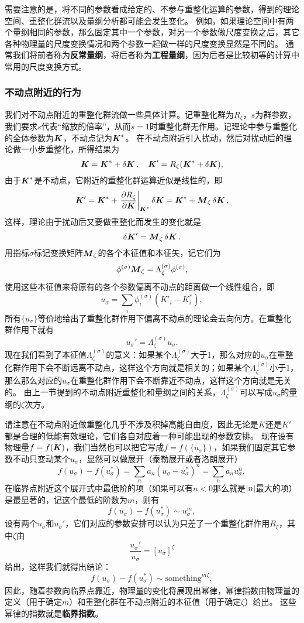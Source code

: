 \documentclass[hyperref, UTF8, a4paper]{ctexart}
\begin{document}
需要注意的是，将不同的参数看成给定的、不参与重整化运算的参数，得到的理论空间、重整化群流以及量纲分析都可能会发生变化。
例如，如果理论空间中有两个量纲相同的参数，那么固定其中一个参数，对另一个参数做尺度变换之后，其它各种物理量的尺度变换情况和两个参数一起做一样的尺度变换显然是不同的。
通常我们将前者称为\textbf{反常量纲}，将后者称为\textbf{工程量纲}，因为后者是比较初等的计算中常用的尺度变换方式。

\subsubsection{不动点附近的行为}

我们对不动点附近的重整化群流做一些具体计算。记重整化群为$R_\zeta$，$s$为群参数，我们要求$s$代表“缩放的倍率”，从而$s=1$时重整化群无作用。记理论中参与重整化的全体参数为$\vb*{K}$，不动点记为$\vb*{K}^*$。
在不动点附近引入扰动，然后对扰动后的理论做一小步重整化，所得结果为
\[
    \vb*{K} = \vb*{K}^* + \var{\vb*{K}} , \quad \vb*{K}' = R_\zeta(\vb*{K}^* + \var{\vb*{K}}),
\]
由于$\vb*{K}^*$是不动点，它附近的重整化群运算近似是线性的，即
\[
    \vb*{K}' = \vb*{K}^* + \eval{\pdv{R_\zeta}{\vb*{K}}}_{\vb*{K}^*} \var{\vb*{K}} = \vb*{K}^* + \vb*{M}_\zeta \var{\vb*{K}},
\]
这样，理论由于扰动后又要做重整化而发生的变化就是
\[
    \var{\vb*{K}'} = \vb*{M}_\zeta \var{\vb*{K}}.
\]
用指标$\sigma$标记变换矩阵$\vb*{M}_\zeta$的各个本征值和本征矢，记它们为
\[
    \phi^{(\sigma)} \vb*{M}_\zeta = \Lambda^{(\sigma)}_\zeta \phi^{(\sigma)},
\]
使用这些本征值来将原有的各个参数偏离不动点的距离做一个线性组合，即
\[
    u_\sigma = \sum_i \phi^{(\sigma)}_i (K'_i - K^*_i), 
\]
所有$\{u_\sigma\}$等价地给出了重整化群作用下偏离不动点的理论会去向何方。在重整化群作用下就有
\[
    u_\sigma' = \Lambda^{(\sigma)}_\zeta u_\sigma.
\]
现在我们看到了本征值$\Lambda_\zeta^{(\sigma)}$的意义：如果某个$\Lambda_\zeta^{(\sigma)}$大于1，那么对应的$u_\sigma$在重整化群作用下会不断远离不动点，这样这个方向就是相关的；如果某个$\Lambda_\zeta^{(\sigma)}$小于1，那么那么对应的$u_\sigma$在重整化群作用下会不断靠近不动点，这样这个方向就是无关的。
由上一节提到的不动点附近重整化和量纲之间的关系，$\Lambda_\zeta^{(\sigma)}$可以写成$u_\sigma$的量纲的$\zeta$次方。

请注意在不动点附近做重整化几乎不涉及积掉高能自由度，因此无论是$K$还是$K'$都是合理的低能有效理论，它们各自对应着一种可能出现的参数安排。
现在设有物理量$f = f(\vb*{K})$，我们当然也可以把它写成$f=f(\{u_\sigma\})$，如果我们固定其它参数不动只变动某个$u_\sigma$，显然可以做展开（泰勒展开或者洛朗展开）
\[
    f(u_\sigma) - f(u_\sigma^*) = \sum_n a_n (u_\sigma - u_\sigma^*)^n = \sum_n a_n u_\sigma^n,
\]
在临界点附近这个展开式中最低阶的项（如果可以有$n<0$那么就是$\abs{n}$最大的项）是最显著的，记这个最低的阶数为$m$，则有
\[
    f(u_\sigma) - f(u_\sigma^*) \sim u_\sigma^m,
\]
设有两个$u_\sigma$和$u_\sigma'$，它们对应的参数安排可以认为只差了一个重整化群作用$R_\zeta$，其中$\zeta$由
\[
    \frac{u_\sigma'}{u_\sigma} = [u_\sigma]^\zeta
\]
给出，这样我们就得出结论：
\[
    f(u_\sigma) - f(u_\sigma^*) \sim \text{something}^{m \zeta},
\]
因此，随着参数向临界点靠近，物理量的变化将展现出幂律，幂律指数由物理量的定义（用于确定$m$）和重整化群在不动点附近的本征值（用于确定$\zeta$）给出。
这些幂律的指数就是\textbf{临界指数}。
\end{document}
